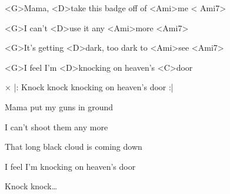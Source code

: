 

\zs
<G>Mama, <D>take this badge off of <Ami>me < Ami7>

<G>I can't <D>use it any <Ami>more <Ami7>

<G>It's getting <D>dark, too dark to <Ami>see <Ami7>

<G>I feel I'm <D>knocking on heaven's <C>door
\ks

× |: Knock knock knocking on heaven's door :|
\kr

\zs
Mama put my guns in ground

I can't shoot them any more

That long black cloud is coming down

I feel I'm knocking on heaven's door
\ks


\zr
Knock knock… \kr
\kp
